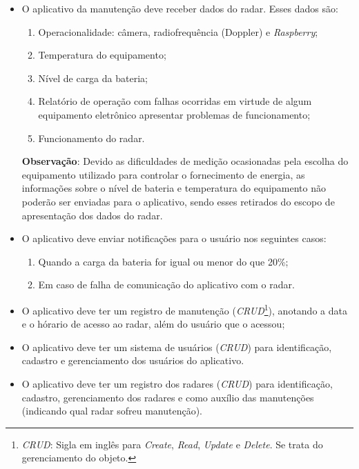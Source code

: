 \begin{itemize}
    \item O aplicativo da manutenção deve receber dados do radar. Esses dados são:
    \begin{enumerate}
        \item Operacionalidade: câmera, radiofrequência (Doppler) e \textit{Raspberry};
        \item Temperatura do equipamento;
        \item Nível de carga da bateria;
        \item Relatório de operação com falhas ocorridas em virtude de algum equipamento eletrônico apresentar problemas de funcionamento;
        \item Funcionamento do radar.
    \end{enumerate}
    
    \textbf{Observação}: Devido as dificuldades de medição ocasionadas pela escolha do equipamento utilizado para controlar o fornecimento de energia, as informações sobre o nível de bateria e temperatura do equipamento não poderão ser enviadas para o aplicativo, sendo esses retirados do escopo de apresentação dos dados do radar.

    \item O aplicativo deve enviar notificações para o usuário nos seguintes casos:
    \begin{enumerate}
        \item Quando a carga da bateria for igual ou menor do que 20\%;
        \item Em caso de falha de comunicação do aplicativo com o radar.
    \end{enumerate}
    
    \item O aplicativo deve ter um registro de manutenção (\textit{CRUD}\footnote{\textit{CRUD}: Sigla em inglês para \textit{Create}, \textit{Read}, \textit{Update} e \textit{Delete}. Se trata do gerenciamento do objeto.}), anotando a data e o hórario de acesso ao radar, além do usuário que o acessou;
    \item O aplicativo deve ter um sistema de usuários (\textit{CRUD}) para identificação, cadastro e gerenciamento dos usuários do aplicativo.
    \item O aplicativo deve ter um registro dos radares (\textit{CRUD}) para identificação, cadastro, gerenciamento dos radares e como auxílio das manutenções (indicando qual radar sofreu manutenção).
\end{itemize}


